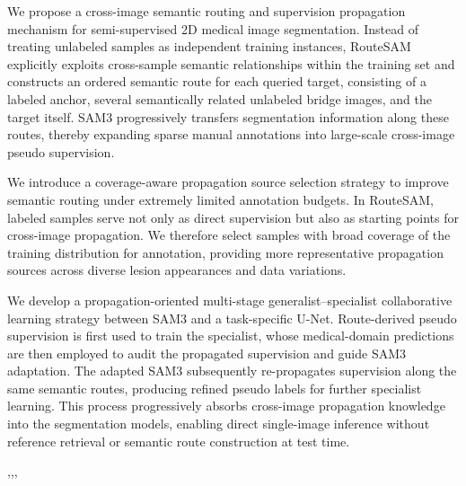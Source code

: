 \documentclass[a4paper,fleqn]{cas-dc}
\begin{document}
\begin{highlights}
\item We propose a cross-image semantic routing and supervision propagation mechanism for semi-supervised 2D medical image segmentation. Instead of treating unlabeled samples as independent training instances, RouteSAM explicitly exploits cross-sample semantic relationships within the training set and constructs an ordered semantic route for each queried target, consisting of a labeled anchor, several semantically related unlabeled bridge images, and the target itself. SAM3 progressively transfers segmentation information along these routes, thereby expanding sparse manual annotations into large-scale cross-image pseudo supervision.

\item We introduce a coverage-aware propagation source selection strategy to improve semantic routing under extremely limited annotation budgets. In RouteSAM, labeled samples serve not only as direct supervision but also as starting points for cross-image propagation. We therefore select samples with broad coverage of the training distribution for annotation, providing more representative propagation sources across diverse lesion appearances and data variations.

\item We develop a propagation-oriented multi-stage generalist–specialist collaborative learning strategy between SAM3 and a task-specific U-Net. Route-derived pseudo supervision is first used to train the specialist, whose medical-domain predictions are then employed to audit the propagated supervision and guide SAM3 adaptation. The adapted SAM3 subsequently re-propagates supervision along the same semantic routes, producing refined pseudo labels for further specialist learning. This process progressively absorbs cross-image propagation knowledge into the segmentation models, enabling direct single-image inference without reference retrieval or semantic route construction at test time. 
\end{highlights}



\begin{keywords}
 \sep \sep \sep
\end{keywords}

\maketitle
\end{document}
